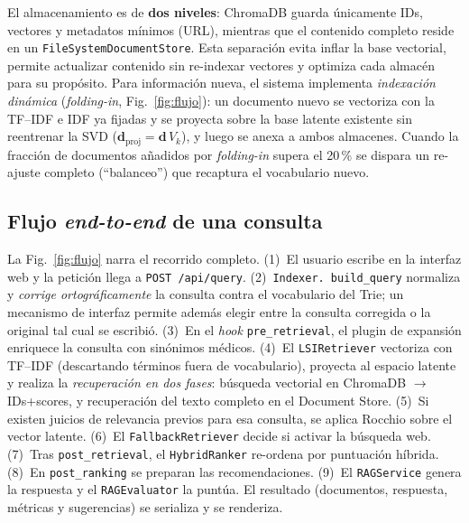 \documentclass[runningheads,a4paper,14pts]{llncs}
\begin{document}
	El almacenamiento es de \textbf{dos niveles}: ChromaDB guarda únicamente IDs,
	vectores y metadatos mínimos (URL), mientras que el contenido completo reside en
	un \texttt{FileSystemDocumentStore}. Esta separación evita inflar la base
	vectorial, permite actualizar contenido sin re-indexar vectores y optimiza cada
	almacén para su propósito. Para información nueva, el sistema implementa
	\emph{indexación dinámica} (\emph{folding-in}, Fig.~\ref{fig:flujo}): un documento
	nuevo se vectoriza con la TF--IDF e IDF ya fijadas y se proyecta sobre la base
	latente existente sin reentrenar la SVD ($\mathbf{d}_{\text{proj}}=\mathbf{d}\,V_k$),
	y luego se anexa a ambos almacenes. Cuando la fracción de documentos añadidos por
	\emph{folding-in} supera el 20\,\% se dispara un re-ajuste completo
	(``balanceo'') que recaptura el vocabulario nuevo.
	
	\subsection{Flujo \emph{end-to-end} de una consulta}
	
	La Fig.~\ref{fig:flujo} narra el recorrido completo. (1)~El usuario escribe en la
	interfaz web y la petición llega a \texttt{POST /api/query}. (2)~\texttt{Indexer.
		build\_query} normaliza y \emph{corrige ortográficamente} la consulta contra el
	vocabulario del Trie; un mecanismo de interfaz permite además elegir entre la
	consulta corregida o la original tal cual se escribió. (3)~En el \emph{hook}
	\texttt{pre\_retrieval}, el plugin de expansión enriquece la consulta con
	sinónimos médicos. (4)~El \texttt{LSIRetriever} vectoriza con TF--IDF (descartando
	términos fuera de vocabulario), proyecta al espacio latente y realiza la
	\emph{recuperación en dos fases}: búsqueda vectorial en ChromaDB
	$\rightarrow$ IDs+scores, y recuperación del texto completo en el Document Store.
	(5)~Si existen juicios de relevancia previos para esa consulta, se aplica Rocchio
	sobre el vector latente. (6)~El \texttt{FallbackRetriever} decide si activar la
	búsqueda web. (7)~Tras \texttt{post\_retrieval}, el \texttt{HybridRanker}
	re-ordena por puntuación híbrida. (8)~En \texttt{post\_ranking} se preparan las
	recomendaciones. (9)~El \texttt{RAGService} genera la respuesta y el
	\texttt{RAGEvaluator} la puntúa. El resultado (documentos, respuesta, métricas y
	sugerencias) se serializa y se renderiza.
	
\end{document}
